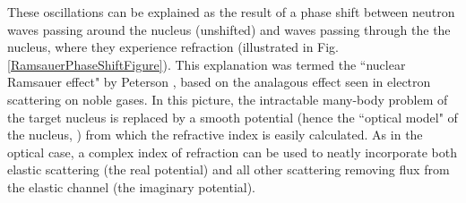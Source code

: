 These oscillations can be explained as the result of a phase shift between 
neutron waves passing around the nucleus (unshifted) and waves passing
through the the nucleus, where they experience refraction
(illustrated in Fig. \ref{RamsauerPhaseShiftFigure}). This explanation was termed the ``nuclear 
Ramsauer effect" by Peterson \cite{Peterson1962}, based on the analagous effect seen in 
electron scattering on noble gases.
In this picture, the intractable many-body
problem of the target nucleus is replaced by a smooth potential (hence the
``optical model" of the nucleus, \cite{Feshbach1958}) from which the refractive
index is easily calculated. As in the optical case, a complex index of
refraction can be used to neatly incorporate both elastic scattering (the real
potential) and all other scattering removing flux from the elastic channel (the imaginary potential).

